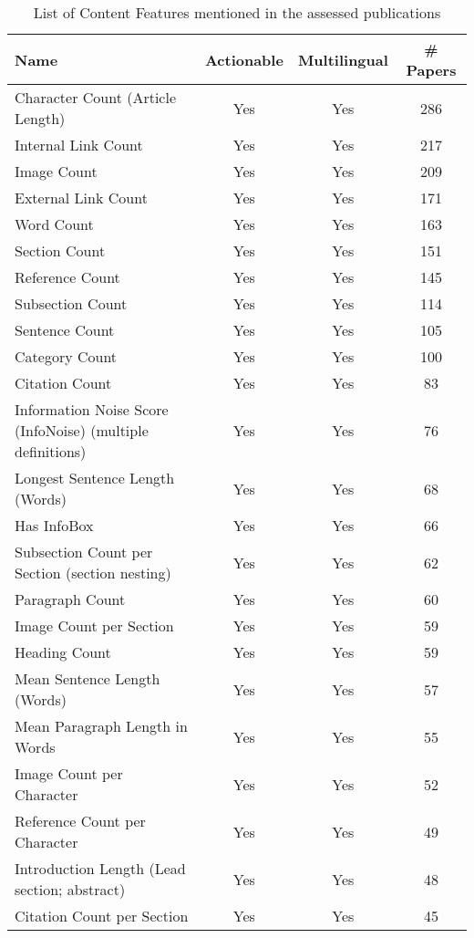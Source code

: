 \begin{table}[htbp]
    \caption{List of Content Features mentioned in the assessed publications}
    \label{tab:feat_Content}
    \centering
    \begin{tabular}{m{} c c c}
        \toprule
        \textbf{Name} & \textbf{Actionable} & \textbf{Multilingual} & \textbf{\# Papers} \\ 
        \midrule
        Character Count (Article Length) & Yes & Yes & 286 \\
        Internal Link Count & Yes & Yes & 217 \\
        Image Count & Yes & Yes & 209 \\
        External Link Count & Yes & Yes & 171 \\
        Word Count & Yes & Yes & 163 \\
        Section Count & Yes & Yes & 151 \\
        Reference Count & Yes & Yes & 145 \\
        Subsection Count & Yes & Yes & 114 \\
        Sentence Count & Yes & Yes & 105 \\
        Category Count & Yes & Yes & 100 \\
        Citation Count & Yes & Yes & 83 \\
        Information Noise Score (InfoNoise) (multiple definitions) & Yes & Yes & 76 \\
        Longest Sentence Length (Words) & Yes & Yes & 68 \\
        Has InfoBox & Yes & Yes & 66 \\
        Subsection Count per Section (section nesting) & Yes & Yes & 62 \\
        Paragraph Count & Yes & Yes & 60 \\
        Image Count per Section & Yes & Yes & 59 \\
        Heading Count & Yes & Yes & 59 \\
        Mean Sentence Length (Words) & Yes & Yes & 57 \\
        Mean Paragraph Length in Words & Yes & Yes & 55 \\
        Image Count per Character & Yes & Yes & 52 \\
        Reference Count per Character & Yes & Yes & 49 \\
        Introduction Length (Lead section; abstract) & Yes & Yes & 48 \\
        Citation Count per Section & Yes & Yes & 45 \\

\end{tabular}
\end{table}
